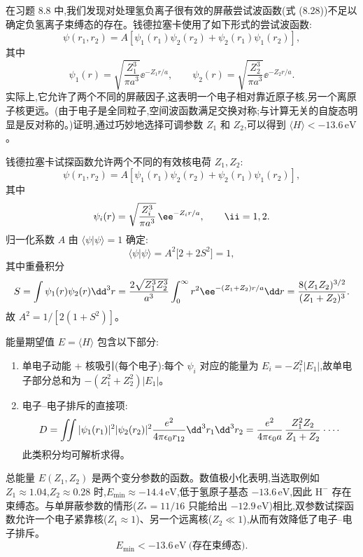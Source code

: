 \begin{question}
在习题 8.8 中,我们发现对处理氢负离子很有效的屏蔽尝试波函数(式 (8.28))不足以确定负氢离子束缚态的存在。钱德拉塞卡使用了如下形式的尝试波函数:
\[
\psi(r_1,r_2)=A[\psi_1(r_1)\psi_2(r_2)+\psi_2(r_1)\psi_1(r_2)],
\]
其中
\[
\psi_1(r)=\sqrt{\frac{Z_1^3}{\pi a^3}}\ee^{-Z_1r/a},\qquad
\psi_2(r)=\sqrt{\frac{Z_2^3}{\pi a^3}}\ee^{-Z_2r/a}.
\]
实际上,它允许了两个不同的屏蔽因子,这表明一个电子相对靠近原子核,另一个离原子核更远。(由于电子是全同粒子,空间波函数满足交换对称;与计算无关的自旋态明显是反对称的。)证明,通过巧妙地选择可调参数 $Z_1$ 和 $Z_2$,可以得到 $\langle H\rangle<-13.6\,\mathrm{eV}$。

\par\smallskip
{}

\begin{solution}
钱德拉塞卡试探函数允许两个不同的有效核电荷 $Z_1,Z_2$:
\[
\psi(r_1,r_2)=A[\psi_1(r_1)\psi_2(r_2)+\psi_2(r_1)\psi_1(r_2)],
\]
其中
\[
\psi_i(r)=\sqrt{Z_i^3\over\pi a^3}\,\ee^{-Z_i r/a},\qquad \ii=1,2.
\]
归一化系数 $A$ 由 $\langle\psi|\psi\rangle=1$ 确定:
\[
\langle\psi|\psi\rangle=A^2\bigl[2+2S^2\bigr]=1,
\]
其中重叠积分
\[
S=\int\psi_1(r)\psi_2(r)\dd^3r
={2\sqrt{Z_1^3Z_2^3}\over a^3}\int_0^\infty r^2 \ee^{-(Z_1+Z_2)r/a}\dd r
={8(Z_1Z_2)^{3/2}\over(Z_1+Z_2)^3}.
\]
故 $A^2=1/[2(1+S^2)]$。

能量期望值 $E=\langle H\rangle$ 包含以下部分:
\begin{enumerate}
\item 单电子动能 + 核吸引(每个电子):每个 $\psi_i$ 对应的能量为 $E_i=-Z_i^2|E_1|$,故单电子部分总和为 $-(Z_1^2+Z_2^2)|E_1|$。
\item 电子--电子排斥的直接项:
\[
D=\iint|\psi_1(r_1)|^2|\psi_2(r_2)|^2{e^2\over4\pi\epsilon_0 r_{12}}\dd^3r_1\dd^3r_2
={e^2\over4\pi\epsilon_0 a}\,{Z_1^2Z_2\over Z_1+Z_2}\cdot\cdots
\]
此类积分均可解析求得。
\end{enumerate}

总能量 $E(Z_1,Z_2)$ 是两个变分参数的函数。数值极小化表明,当选取例如 $Z_1\approx1.04$,$Z_2\approx0.28$ 时,$E_{\min}\approx-14.4\,\mathrm{eV}$,低于氢原子基态 $-13.6\,\mathrm{eV}$,因此 $\mathrm H^-$ 存在束缚态。与单屏蔽参数的情形($Z_*=11/16$ 只能给出 $-12.9\,\mathrm{eV}$)相比,双参数试探函数允许一个电子紧靠核($Z_1\approx1$)、另一个远离核($Z_2\ll1$),从而有效降低了电子--电子排斥。
\[
\boxed{E_{\min}<-13.6\,\mathrm{eV}\ \text{(存在束缚态)}}.
\]
\end{solution}
\end{question}

